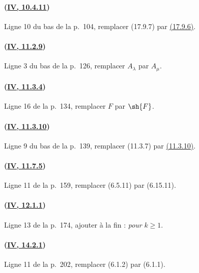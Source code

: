 \paragraph{({\texorpdfstring{\protect\hyperref[canon-index.ega4.c04.statement.10-4-11]{IV, 10.4.11}}{IV, 10.4.11}})}
Ligne 10 du bas de la p.~104, remplacer (17.9.7) par
{\hyperlink{ega4.c04.prop.17-9-6}{(17.9.6)}}.

\paragraph{({\texorpdfstring{\protect\hyperref[canon-index.ega4.c04.thm.11-2-9]{IV, 11.2.9}}{IV, 11.2.9}})}
Ligne 3 du bas de la p.~126, remplacer $A_\lambda$ par $A_\mu$.

\paragraph{({\texorpdfstring{\protect\hyperref[canon-index.ega4.c04.prop.11-3-4]{IV, 11.3.4}}{IV, 11.3.4}})}
Ligne 16 de la p.~134, remplacer $F$ par $\sh{F}$.

\paragraph{({\texorpdfstring{\protect\hyperref[canon-index.ega4.c04.thm.11-3-10]{IV, 11.3.10}}{IV, 11.3.10}})}
Ligne 9 du bas de la p.~139, remplacer (11.3.7) par
{\hyperref[canon-index.ega4.c04.thm.11-3-10]{(11.3.10)}}.

\paragraph{({\texorpdfstring{\protect\hyperref[canon-index.ega4.c04.statement.11-7-5]{IV, 11.7.5}}{IV, 11.7.5}})}
Ligne 11 de la p.~159, remplacer (6.5.11) par (6.15.11).

\paragraph{({\texorpdfstring{\protect\hyperref[canon-index.ega4.c04.thm.12-1-1]{IV, 12.1.1}}{IV, 12.1.1}})}
Ligne 13 de la p.~174, ajouter à la fin : \emph{pour} $k\geq1$.

\paragraph{({\texorpdfstring{\protect\hyperref[canon-index.ega4.c04.thm.14-2-1]{IV, 14.2.1}}{IV, 14.2.1}})}
Ligne 11 de la p.~202, remplacer (6.1.2) par (6.1.1).

